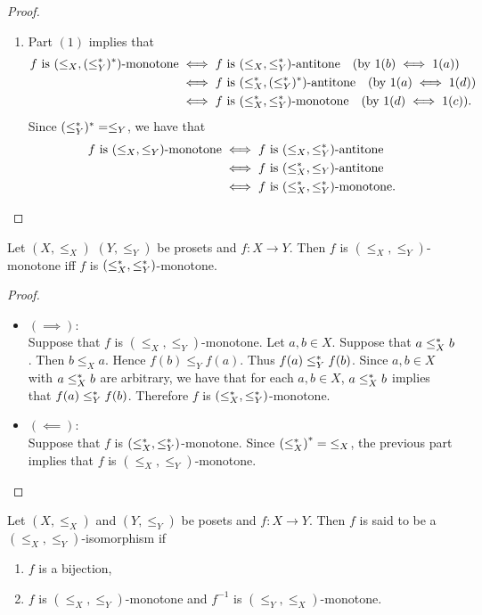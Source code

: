 \documentclass{book}
\begin{document}
\begin{proof}
\begin{enumerate}
\begin{itemize}
			\end{itemize}
			\item Part $(1)$ implies that 
			\begin{align*}
				\text{$f$ is $(\leq_X, (\leq^*_Y)^*)$-monotone}
				& \iff \text{$f$ is $(\leq_X, \leq^*_Y)$-antitone} \quad \text{(by $1(b) \iff 1(a)$)} \\
				& \iff \text{$f$ is $(\leq^*_X, (\leq^*_Y)^*)$-antitone} \quad \text{(by $1(a) \iff 1(d)$)} \\
				& \iff \text{$f$ is $(\leq^*_X, \leq^*_Y)$-monotone} \quad \text{(by $1(d) \iff 1(c)$)}.
			\end{align*}
			Since $(\leq^*_Y)^* = \leq_Y$, we have that
			\begin{align*}
				\text{$f$ is $(\leq_X, \leq_Y)$-monotone}
				& \iff \text{$f$ is $(\leq_X, \leq^*_Y)$-antitone} \\
				& \iff \text{$f$ is $(\leq^*_X, \leq_Y)$-antitone} \\
				& \iff \text{$f$ is $(\leq^*_X, \leq^*_Y)$-monotone}.
			\end{align*}
		\end{enumerate}
	\end{proof}
	
	\begin{ex} 
		Let $(X, \leq_X)$ $(Y, \leq_Y)$ be prosets and $f:X \rightarrow Y$. Then $f$ is $(\leq_X, \leq_Y)$-monotone iff $f$ is $(\leq^*_X, \leq^*_Y)$-monotone.
	\end{ex}
	
	\begin{proof}\
		\begin{itemize}
			\item $(\implies)$: \\
			Suppose that $f$ is $(\leq_X, \leq_Y)$-monotone. Let $a,b \in X$. Suppose that $a \leq^*_X b$. Then $b \leq_X a$. Hence $f(b) \leq_Y f(a)$. Thus $f(a) \leq^*_Y f(b)$. Since $a,b \in X$ with $a \leq^*_X b$ are arbitrary, we have that for each $a,b \in X$, $a \leq^*_X b$ implies that $f(a) \leq^*_Y f(b)$. Therefore $f$ is $(\leq^*_X, \leq^*_Y)$-monotone.
			\item $(\impliedby)$: \\
			Suppose that $f$ is $(\leq^*_X, \leq^*_Y)$-monotone. Since ${(\leq^*_X)}^* = {\leq_X}$, the previous part implies that $f$ is $(\leq_X, \leq_Y)$-monotone.
		\end{itemize}
	\end{proof}
	
	\begin{defn} 
		Let $(X, \leq_X)$ and $(Y, \leq_Y)$ be posets and $f:X \rightarrow Y$. Then $f$ is said to be a $(\leq_X, \leq_Y)$-isomorphism if 
		\begin{enumerate}
			\item $f$ is a bijection,
			\item $f$ is $(\leq_X, \leq_Y)$-monotone and $f^{-1}$ is $(\leq_Y, \leq_X)$-monotone.
		\end{enumerate}
	\end{defn}
	
\end{document}
